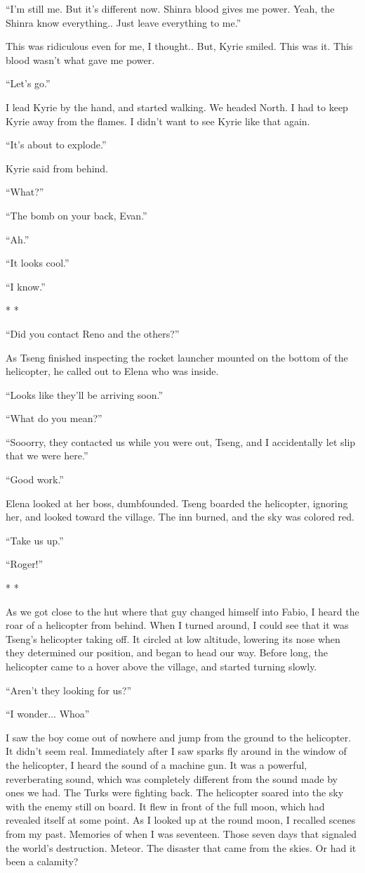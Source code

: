 \documentclass[oneside]{book}
\begin{document}
“I’m still me. But it’s different now. Shinra blood gives me power. Yeah, the Shinra know everything.. Just leave everything to me.”

This was ridiculous even for me, I thought.. But, Kyrie smiled. This was it. This blood wasn’t what gave me power.

“Let’s go.”

I lead Kyrie by the hand, and started walking. We headed North. I had to keep Kyrie away from the flames. I didn’t want to see Kyrie like that again.

“It’s about to explode.”

Kyrie said from behind.

“What?”

“The bomb on your back, Evan.”

“Ah.”

“It looks cool.”

“I know.”

* *

“Did you contact Reno and the others?”

As Tseng finished inspecting the rocket launcher mounted on the bottom of the helicopter, he called out to Elena who was inside.

“Looks like they’ll be arriving soon.”

“What do you mean?”

“Sooorry, they contacted us while you were out, Tseng, and I accidentally let slip that we were here.”

“Good work.”

Elena looked at her boss, dumbfounded. Tseng boarded the helicopter, ignoring her, and looked toward the village. The inn burned, and the sky was colored red.

“Take us up.”

“Roger!”

* *

As we got close to the hut where that guy changed himself into Fabio, I heard the roar of a helicopter from behind. When I turned around, I could see that it was Tseng’s helicopter taking off. It circled at low altitude, lowering its nose when they determined our position, and began to head our way. Before long, the helicopter came to a hover above the village, and started turning slowly.

“Aren’t they looking for us?”

“I wonder... Whoa”

I saw the boy come out of nowhere and jump from the ground to the helicopter. It didn’t seem real. Immediately after I saw sparks fly around in the window of the helicopter, I heard the sound of a machine gun. It was a powerful, reverberating sound, which was completely different from the sound made by ones we had. The Turks were fighting back. The helicopter soared into the sky with the enemy still on board. It flew in front of the full moon, which had revealed itself at some point. As I looked up at the round moon, I recalled scenes from my past. Memories of when I was seventeen. Those seven days that signaled the world’s destruction. Meteor. The disaster that came from the skies. Or had it been a calamity?
\end{document}
